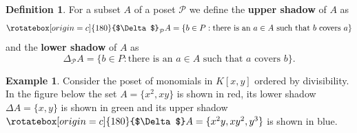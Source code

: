 \documentclass[11pt, reqno]{amsart}
\renewcommand{\P}{{\mathcal P}}
\newcommand{\dSdw}{\Delta}
\newcommand{\uSdw}{\rotatebox[origin=c]{180}{$\Delta$}}
\theoremstyle{plain} %
\theoremstyle{definition}
\newtheorem{defn}[thm]{Definition}
\newtheorem{ex}[thm]{Example}
\theoremstyle{remark}
\numberwithin{equation}{section}  %
\begin{document}
\begin{defn}
For a subset $A$ of a poset $\P$ we define the {\bf upper shadow} of $A$ as
\[
\uSdw_\P A=\{b\in P : \text{there is an } a\in A \text{ such that } b \text{ covers } a\}
\]
and the {\bf lower shadow} of $A$ as
\[
\dSdw_\P A =\{b\in P :  \text{there is an } a\in A \text{ such that }  a \text{ covers } b\}.
\]
\end{defn}


\begin{ex} Consider the poset of monomials in $K[x,y]$ ordered by divisibility. In the figure below  the set $A=\{x^2,xy\}$ is shown in red, its lower shadow $\dSdw A=\{x,y\}$ is shown in green and its upper shadow $\uSdw A=\{x^2y,xy^2,y^3\}$ is shown in blue.

\end{ex}
\end{document}
